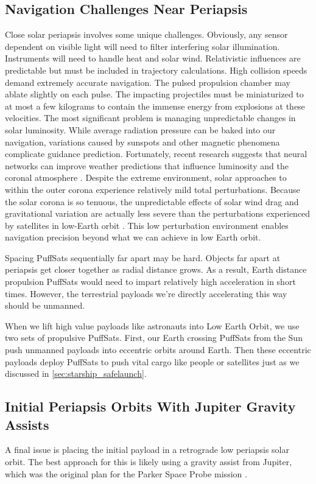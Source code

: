 \documentclass{article}
\begin{document}
{\subsection{Navigation Challenges Near Periapsis}\label{sec:periapsis_challenges}
Close solar periapsis involves some unique challenges.   Obviously, any sensor dependent on visible light will need to filter interfering solar illumination.   Instruments will need to handle heat and solar wind.  Relativistic influences are predictable but must be included in trajectory calculations.  High collision speeds demand extremely accurate navigation.   The pulsed propulsion chamber may ablate slightly on each pulse.  The impacting projectiles must be miniaturized to at most a few kilograms to contain the immense energy from explosions at these velocities. The most significant problem is managing unpredictable changes in solar luminosity.  While average radiation pressure can be baked into our navigation, variations caused by sunspots and other magnetic phenomena complicate guidance prediction. Fortunately, recent research suggests that neural networks can improve weather predictions that influence luminosity and the coronal atmosphere \cite{lam2023learning}.  Despite the extreme environment, solar approaches to within the outer corona experience relatively mild total perturbations. Because the solar corona is so tenuous, the unpredictable effects of solar wind drag and gravitational variation are actually less severe than the perturbations experienced by satellites in low-Earth orbit \cite{leo_orbit_perturbation_simulation, corona_density}.  This low perturbation environment enables navigation precision beyond what we can achieve in low Earth orbit.
  
Spacing PuffSats sequentially far apart  may be hard.  Objects far apart at periapsis get closer together as radial distance grows.  As a result, Earth distance propulsion PuffSats would need to impart relatively high acceleration in short times.  However, the terrestrial payloads we're directly accelerating this way should be unmanned.   

When we lift high value payloads like astronauts into Low Earth Orbit, we use two sets of propulsive PuffSats. First, our Earth crossing PuffSats from the Sun push unmanned payloads into eccentric orbits around Earth. Then these eccentric payloads deploy PuffSats to push vital cargo like people or  satellites just as we discussed in \autoref{sec:starship_safelaunch}.

\subsection{Initial Periapsis Orbits With Jupiter Gravity Assists} \label{sec:jupiter_gravity_initial}
A final issue is placing the initial payload in a retrograde low periapsis solar orbit.  The best approach for this is likely using a gravity assist from Jupiter, which was the original plan for the Parker Space Probe mission \cite{mccomas2005solar}. 

}
\end{document}
